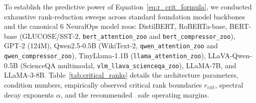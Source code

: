 To establish the predictive power of Equation~\eqref{eq:r_crit_formula}, we conducted exhaustive rank-reduction sweeps across standard foundation model backbones and the canonical 6 NeuralOps model zoos: DistilBERT, RoBERTa-base, BERT-base (GLUCOSE/SST-2, \texttt{bert\_attention\_zoo} and \texttt{bert\_compressor\_zoo}), GPT-2 (124M), Qwen2.5-0.5B (WikiText-2, \texttt{qwen\_attention\_zoo} and \texttt{qwen\_compressor\_zoo}), TinyLlama-1.1B (\texttt{llama\_attention\_zoo}), LLaVA-Qwen-0.5B (ScienceQA multimodal, \texttt{vlm\_llava\_scienceqa\_zoo}), LLaMA-7B, and LLaMA-3-8B. Table~\ref{tab:critical_ranks} details the architecture parameters, condition numbers, empirically observed critical rank boundaries $r_{\text{crit}}$, spectral decay exponents $\alpha$, and the recommended \neuralops\ safe operating margins.

